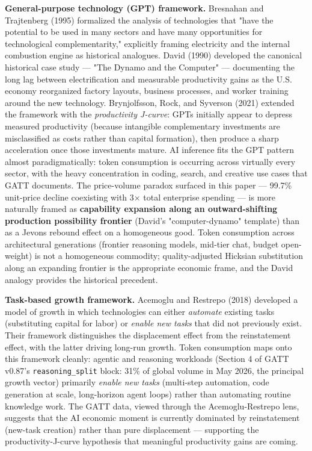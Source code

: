 \documentclass[11pt,a4paper]{article}
\begin{document}
\textbf{General-purpose technology (GPT) framework.} Bresnahan and Trajtenberg (1995) \cite{bresnahan1995general} formalized the analysis of technologies that "have the potential to be used in many sectors and have many opportunities for technological complementarity," explicitly framing electricity and the internal combustion engine as historical analogues. David (1990) \cite{david1990dynamo} developed the canonical historical case study --- "The Dynamo and the Computer" --- documenting the long lag between electrification and measurable productivity gains as the U.S. economy reorganized factory layouts, business processes, and worker training around the new technology. Brynjolfsson, Rock, and Syverson (2021) \cite{brynjolfsson2021productivity} extended the framework with the \emph{productivity J-curve}: GPTs initially appear to depress measured productivity (because intangible complementary investments are misclassified as costs rather than capital formation), then produce a sharp acceleration once those investments mature. AI inference fits the GPT pattern almost paradigmatically: token consumption is occurring across virtually every sector, with the heavy concentration in coding, search, and creative use cases that GATT documents. The price-volume paradox surfaced in this paper --- 99.7\% unit-price decline coexisting with 3× total enterprise spending --- is more naturally framed as \textbf{capability expansion along an outward-shifting production possibility frontier} (David's "computer-dynamo" template) than as a Jevons rebound effect on a homogeneous good. Token consumption across architectural generations (frontier reasoning models, mid-tier chat, budget open-weight) is not a homogeneous commodity; quality-adjusted Hicksian substitution along an expanding frontier is the appropriate economic frame, and the David analogy provides the historical precedent.

\textbf{Task-based growth framework.} Acemoglu and Restrepo (2018) \cite{acemoglu2018task} developed a model of growth in which technologies can either \emph{automate} existing tasks (substituting capital for labor) or \emph{enable new tasks} that did not previously exist. Their framework distinguishes the displacement effect from the reinstatement effect, with the latter driving long-run growth. Token consumption maps onto this framework cleanly: agentic and reasoning workloads (Section 4 of GATT v0.87's \texttt{reasoning\_split} block: 31\% of global volume in May 2026, the principal growth vector) primarily \emph{enable new tasks} (multi-step automation, code generation at scale, long-horizon agent loops) rather than automating routine knowledge work. The GATT data, viewed through the Acemoglu-Restrepo lens, suggests that the AI economic moment is currently dominated by reinstatement (new-task creation) rather than pure displacement --- supporting the productivity-J-curve hypothesis that meaningful productivity gains are coming.
\end{document}
